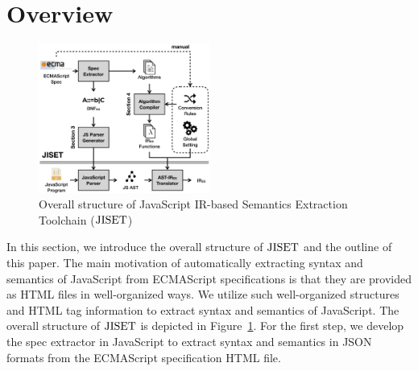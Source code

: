 \section{Overview}

\begin{figure}
  \centering
  \includegraphics[width=0.5\textwidth]{img/overview.png}
  \caption{Overall structure of JavaScript IR-based Semantics Extraction Toolchain (\( \text{JISET} \))}
  \label{fig:overview}
\end{figure}

In this section, we introduce the overall structure of \( \text{JISET} \) and the outline of
this paper. The main motivation of automatically extracting syntax and semantics of JavaScript
from ECMAScript specifications is that they are provided as HTML files in well-organized ways.
We utilize such well-organized structures and HTML tag information to extract
syntax and semantics of JavaScript. The overall structure of \( \text{JISET} \) is depicted
in Figure~\ref{fig:overview}. For the first step, we develop the spec extractor
in JavaScript to extract syntax and semantics in JSON formats from
the ECMAScript specification HTML file.

